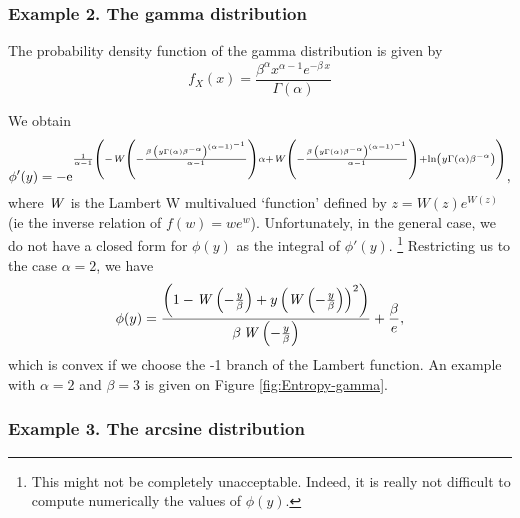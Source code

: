 \documentclass[english,onecolumn]{elsarticle}
\begin{document}
\subsubsection{Example 2. The gamma distribution}

The probability density function of the gamma distribution is given
by 
\[
f_{X}(x)=\frac{{\beta}^{\alpha}{x}^{\alpha-1}{e}^{-\beta\, x}}{\Gamma\left(\alpha\right)}
\]


We obtain 
\[
\phi'(y)=-{{\rm e}^{\frac{1}{\alpha-1}\left(-{\it W}\left(-{\frac{\beta\,\left(y\Gamma\left(\alpha\right){\beta}^{-\alpha}\right)^{\left(\alpha-1\right)^{-1}}}{\alpha-1}}\right)\alpha+{\it W}\left(-{\frac{\beta\,\left(y\Gamma\left(\alpha\right){\beta}^{-\alpha}\right)^{\left(\alpha-1\right)^{-1}}}{\alpha-1}}\right)+\ln\left(y\Gamma\left(\alpha\right){\beta}^{-\alpha}\right)\right)}},
\]
where ${\it W}$ is the Lambert W multivalued `function' defined by
$z=W(z)e^{W(z)}$ (ie the inverse relation of $f(w)=we^{w}$). Unfortunately,
in the general case, we do not have a closed form for $\phi(y)$ as
the integral of $\phi'(y)$.%
\footnote{This might not be completely unacceptable. Indeed, it is really not
difficult to compute numerically the values of $\phi(y).$%
} Restricting us to the case $\alpha=2$, we have
\[
\phi(y)=\frac{\left(1-{\it W}\left(-{\frac{y}{\beta}}\right)+y\left({\it W}\left(-{\frac{y}{\beta}}\right)\right)^{2}\right)}{{\it \beta\, W}\left(-{\frac{y}{\beta}}\right)}+\frac{\beta}{e},
\]
which is convex if we choose the -1 branch of the Lambert function.
An example with $\alpha=2$ and $\beta=3$ is given on Figure \ref{fig:Entropy-gamma}.
\begin{figure}
\end{figure}



\subsubsection{Example 3. The arcsine distribution}
\end{document}

